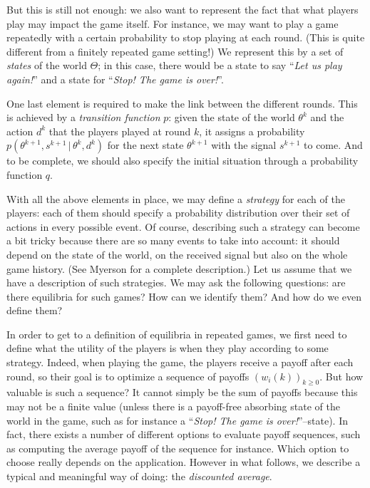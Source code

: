 But this is still not enough: we also want to represent the fact that what players play may impact the game itself. For instance, we may want to play a game repeatedly with a certain probability to stop playing at each round. (This is quite different from a finitely repeated game setting!) We represent this by a set of \emph{states} of the world $\Theta$; in this case, there would be a state to say ``\emph{Let us play again!}'' and a state for ``\emph{Stop! The game is over!}''.

One last element is required to make the link between the different rounds. This is achieved by a \emph{transition function} $p$: given the state of the world $\theta^k$ and the action $d^k$ that the players played at round $k$, it assigns a probability $p(\theta^{k+1}, s^{k+1} \, | \, \theta^k, d^k)$ for the next state $\theta^{k+1}$ with the signal $s^{k+1}$ to come. And to be complete, we should also specify the initial situation through a probability function $q$.

With all the above elements in place, we may define a \emph{strategy} for each of the players: each of them should specify a probability distribution over their set of actions in every possible event. Of course, describing such a strategy can become a bit tricky because there are so many events to take into account: it should depend on the state of the world, on the received signal but also on the whole game history. (See Myerson for a complete description.) Let us assume that we have a description of such strategies. We may ask the following questions: are there equilibria for such games? How can we identify them? And how do we even define them?

In order to get to a definition of equilibria in repeated games, we first need to define what the utility of the players is when they play according to some strategy. Indeed, when playing the game, the players receive a payoff after each round, so their goal is to optimize a sequence of payoffs $(w_i(k))_{k \geq 0}$. But how valuable is such a sequence? It cannot simply be the sum of payoffs because this may not be a finite value (unless there is a payoff-free absorbing state of the world in the game, such as for instance a ``\emph{Stop! The game is over!}''--state). In fact, there exists a number of different options to evaluate payoff sequences, such as computing the average payoff of the sequence for instance. Which option to choose really depends on the application. However in what follows, we describe a typical and meaningful way of doing: the \emph{discounted average}. 

